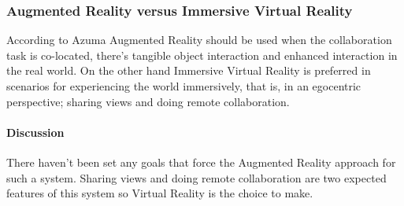 \subsubsection{Augmented Reality versus Immersive Virtual Reality}

According to Azuma \cite{OVERVIEW-AR} Augmented Reality should be used
when the collaboration task is co-located,
there's tangible object interaction and
enhanced interaction in the real world.
On the other hand Immersive Virtual Reality is preferred in scenarios for
experiencing the world immersively, that is, in an egocentric perspective;
sharing views and
doing remote collaboration.

\paragraph{Discussion}
There haven't been set any goals that force the Augmented Reality approach for such a system.
Sharing views and doing remote collaboration are two expected features of this system so
Virtual Reality is the choice to make.


%
